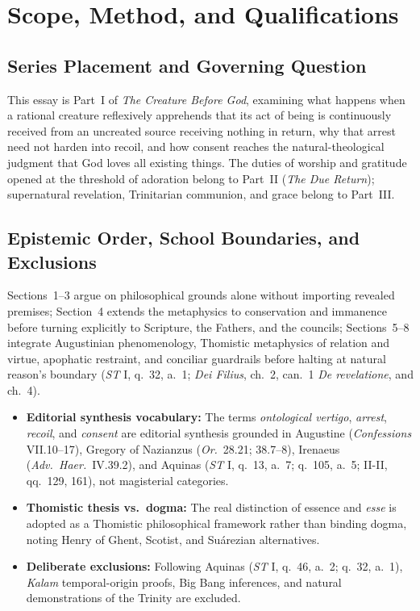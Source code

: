 \section{Scope, Method, and Qualifications}

\subsection*{Series Placement and Governing Question}

This essay is Part~I of \emph{The Creature Before God}, examining what happens when a rational creature reflexively apprehends that its act of being is continuously received from an uncreated source receiving nothing in return, why that arrest need not harden into recoil, and how consent reaches the natural-theological judgment that God loves all existing things. The duties of worship and gratitude opened at the threshold of adoration belong to Part~II (\emph{The Due Return}); supernatural revelation, Trinitarian communion, and grace belong to Part~III.

\subsection*{Epistemic Order, School Boundaries, and Exclusions}

Sections~1--3 argue on philosophical grounds alone without importing revealed premises; Section~4 extends the metaphysics to conservation and immanence before turning explicitly to Scripture, the Fathers, and the councils; Sections~5--8 integrate Augustinian phenomenology, Thomistic metaphysics of relation and virtue, apophatic restraint, and conciliar guardrails before halting at natural reason's boundary (\emph{ST} I, q.~32, a.~1; \emph{Dei Filius}, ch.~2, can.~1 \emph{De revelatione}, and ch.~4).

\begin{itemize}
\item \textbf{Editorial synthesis vocabulary:} The terms \emph{ontological vertigo}, \emph{arrest}, \emph{recoil}, and \emph{consent} are editorial synthesis grounded in Augustine (\emph{Confessions} VII.10--17), Gregory of Nazianzus (\emph{Or.}~28.21; 38.7--8), Irenaeus (\emph{Adv.\ Haer.}~IV.39.2), and Aquinas (\emph{ST} I, q.~13, a.~7; q.~105, a.~5; II-II, qq.~129, 161), not magisterial categories.
\item \textbf{Thomistic thesis vs.\ dogma:} The real distinction of essence and \emph{esse} is adopted as a Thomistic philosophical framework rather than binding dogma, noting Henry of Ghent, Scotist, and Su\'{a}rezian alternatives.
\item \textbf{Deliberate exclusions:} Following Aquinas (\emph{ST} I, q.~46, a.~2; q.~32, a.~1), \emph{Kalam} temporal-origin proofs, Big Bang inferences, and natural demonstrations of the Trinity are excluded.
\end{itemize}

